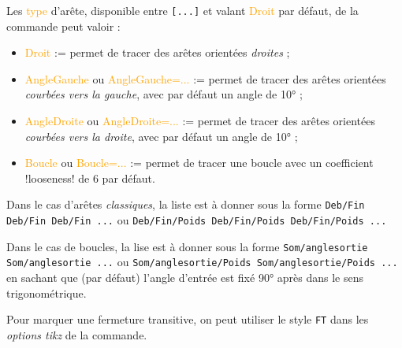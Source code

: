 \documentclass[french,a4paper,11pt]{article}
\newcommand\Cle[1]{{\small\sffamily\textlangle \textcolor{orange}{#1}\textrangle}}
\begin{document}
{\begin{tipblock}
\smallskip

Les \Cle{type} d'arête, disponible entre \texttt{[...]} et valant \Cle{Droit} par défaut, de la commande peut valoir :

\begin{itemize}
	\item \Cle{Droit} := permet de tracer des arêtes orientées \textit{droites} ;
	\item \Cle{AngleGauche} ou \Cle{AngleGauche=...} := permet de tracer des arêtes orientées \textit{courbées vers la gauche}, avec par défaut un angle de 10° ;
	\item \Cle{AngleDroite} ou \Cle{AngleDroite=...} := permet de tracer des arêtes orientées \textit{courbées vers la droite}, avec par défaut un angle de 10° ;
	\item \Cle{Boucle} ou \Cle{Boucle=...} := permet de tracer une boucle avec un coefficient \motcletex!looseness! de 6 par défaut.
\end{itemize}

Dans le cas d'arêtes \textit{classiques}, la liste est à donner sous la forme \verb|Deb/Fin Deb/Fin Deb/Fin ...| ou \verb|Deb/Fin/Poids Deb/Fin/Poids Deb/Fin/Poids ...|

\smallskip

Dans le cas de boucles, la lise est à donner sous la forme \verb|Som/anglesortie Som/anglesortie ...| ou \verb|Som/anglesortie/Poids Som/anglesortie/Poids ...| en sachant que (par défaut) l'angle d'entrée est fixé 90° après dans le sens trigonométrique.

\smallskip

Pour marquer une fermeture transitive, on peut utiliser le style \verb|FT| dans les \textit{options tikz} de la commande.
\end{tipblock}

\begin{DemoCode}[]
\begin{GrapheTikz}
\end{GrapheTikz}
\hspace{5mm}
\begin{GrapheTikz}
\end{GrapheTikz}
\hspace{5mm}
\begin{GrapheTikz}
\end{GrapheTikz}
\end{DemoCode}

}
\end{document}
